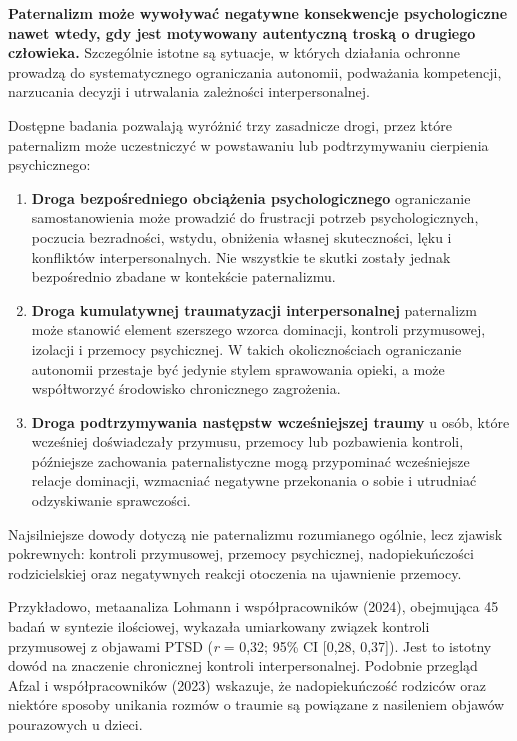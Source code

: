 \documentclass[11pt,a4paper,oneside,headinclude=true,footinclude=false]{scrartcl}
\providecommand{\tightlist}{\setlength{\itemsep}{3pt}\setlength{\parskip}{0pt}}
\begin{document}
\textbf{Paternalizm może wywoływać negatywne konsekwencje psychologiczne
nawet wtedy, gdy jest motywowany autentyczną troską o drugiego
człowieka.} Szczególnie istotne są sytuacje, w których działania
ochronne prowadzą do systematycznego ograniczania autonomii, podważania
kompetencji, narzucania decyzji i utrwalania zależności
interpersonalnej.

Dostępne badania pozwalają wyróżnić trzy zasadnicze drogi, przez które
paternalizm może uczestniczyć w powstawaniu lub podtrzymywaniu
cierpienia psychicznego:

\begin{enumerate}
\def\labelenumi{\arabic{enumi}.}
\tightlist
\item
  \textbf{Droga bezpośredniego obciążenia psychologicznego}
  ograniczanie samostanowienia może prowadzić do frustracji potrzeb
  psychologicznych, poczucia bezradności, wstydu, obniżenia własnej
  skuteczności, lęku i konfliktów interpersonalnych. Nie wszystkie te
  skutki zostały jednak bezpośrednio zbadane w kontekście
  paternalizmu.
\item
  \textbf{Droga kumulatywnej traumatyzacji interpersonalnej}
  paternalizm może stanowić element szerszego wzorca dominacji, kontroli
  przymusowej, izolacji i przemocy psychicznej. W takich okolicznościach
  ograniczanie autonomii przestaje być jedynie stylem sprawowania
  opieki, a może współtworzyć środowisko chronicznego zagrożenia.
\item
  \textbf{Droga podtrzymywania następstw wcześniejszej traumy} u osób,
  które wcześniej doświadczały przymusu, przemocy lub pozbawienia
  kontroli, późniejsze zachowania paternalistyczne mogą przypominać
  wcześniejsze relacje dominacji, wzmacniać negatywne przekonania o
  sobie i utrudniać odzyskiwanie sprawczości.
\end{enumerate}

Najsilniejsze dowody dotyczą nie paternalizmu rozumianego ogólnie, lecz
zjawisk pokrewnych: kontroli przymusowej, przemocy psychicznej,
nadopiekuńczości rodzicielskiej oraz negatywnych reakcji otoczenia na
ujawnienie przemocy.

Przykładowo, metaanaliza Lohmann i współpracowników (2024), obejmująca
45 badań w syntezie ilościowej, wykazała umiarkowany związek kontroli
przymusowej z objawami PTSD (\emph{r} = 0,32; 95\% CI {[}0,28, 0,37{]}).
Jest to istotny dowód na znaczenie chronicznej kontroli
interpersonalnej. Podobnie przegląd Afzal i współpracowników (2023) wskazuje, że
nadopiekuńczość rodziców oraz niektóre sposoby unikania rozmów o traumie
są powiązane z nasileniem objawów pourazowych u dzieci.
\end{document}
